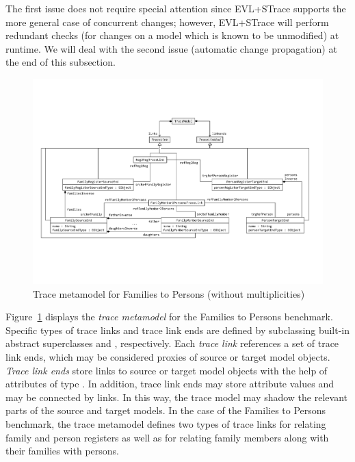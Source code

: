 The first issue does not require special attention since EVL+STrace supports the more general case of concurrent changes; however, EVL+STrace will perform redundant checks (for changes on a model which is known to be unmodified) at runtime. We will deal with the second issue (automatic change propagation) at the end of this subsection. 

\begin{figure}[tb!]
	\centering
	\includegraphics[width=\textwidth]{diagrams/EVLPlusSTraceMetamodel}
	\caption{Trace metamodel for Families to Persons (without multiplicities)}
	\label{fig:evltracemetamodel}
\end{figure}

Figure~\ref{fig:evltracemetamodel} displays the \emph{trace metamodel} for the Families to Persons benchmark. Specific types of trace links and trace link ends are defined by subclassing built-in abstract superclasses  and , respectively. Each \emph{trace link} references a set of trace link ends, which may be considered proxies of source or target model objects. \emph{Trace link ends} store links to source or target model objects with the help of attributes of type . In addition, trace link ends may store attribute values and may be connected by links. In this way, the trace model may shadow the relevant parts of the source and target models. In the case of the Families to Persons benchmark, the trace metamodel defines two types of trace links for relating family and person registers as well as for relating family members along with their families with persons.



